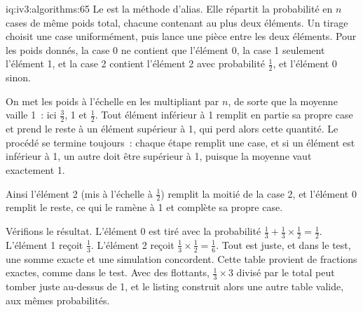 \begin{solution}{iq:iv3:algorithms:65}
Le  est la méthode d'alias. Elle répartit la probabilité en $n$ cases de même poids total, chacune contenant au plus deux éléments. Un tirage choisit une case uniformément, puis lance une pièce entre les deux éléments. Pour les poids donnés, la case 0 ne contient que l'élément 0, la case 1 seulement l'élément 1, et la case 2 contient l'élément 2 avec probabilité $\frac{1}{2}$, et l'élément 0 sinon.
\label{lst:iv3:al:alias}

On met les poids à l'échelle en les multipliant par $n$, de sorte que la moyenne vaille 1~: ici $\frac{3}{2}$, 1 et $\frac{1}{2}$. Tout élément inférieur à 1 remplit en partie sa propre case et prend le reste à un élément supérieur à 1, qui perd alors cette quantité. Le procédé se termine toujours~: chaque étape remplit une case, et si un élément est inférieur à 1, un autre doit être supérieur à 1, puisque la moyenne vaut exactement 1.

Ainsi l'élément 2 (mis à l'échelle à $\frac{1}{2}$) remplit la moitié de la case 2, et l'élément 0 remplit le reste, ce qui le ramène à 1 et complète sa propre case.

Vérifions le résultat. L'élément 0 est tiré avec la probabilité $\frac{1}{3} + \frac{1}{3} \times \frac{1}{2} = \frac{1}{2}$. L'élément 1 reçoit $\frac{1}{3}$. L'élément 2 reçoit $\frac{1}{3} \times \frac{1}{2} = \frac{1}{6}$. Tout est juste, et dans le test, une somme exacte et une simulation concordent. Cette table provient de fractions exactes, comme dans le test. Avec des flottants, $\frac{1}{3} \times 3$ divisé par le total peut tomber juste au-dessus de 1, et le listing construit alors une autre table valide, aux mêmes probabilités.

\end{solution}

